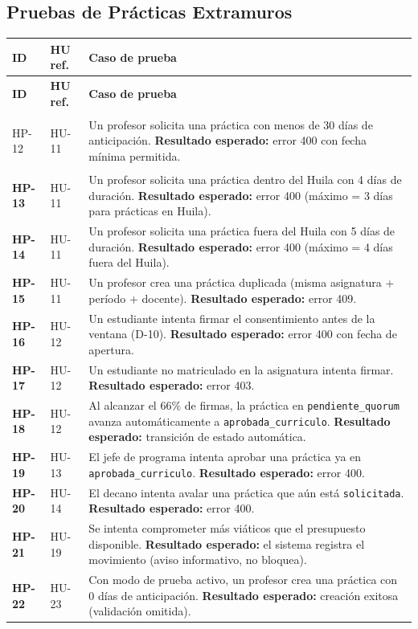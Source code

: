 \documentclass[12pt,a4paper]{article}
\begin{document}
\subsection{Pruebas de Prácticas Extramuros}

\begin{longtable}{>{\bfseries}p{1.2cm} p{2.5cm} p{9.5cm}}
  \toprule
  \textbf{ID} & \textbf{HU ref.} & \textbf{Caso de prueba} \\
  \midrule
  \endfirsthead
  \toprule \textbf{ID} & \textbf{HU ref.} & \textbf{Caso de prueba} \\ \midrule
  \endhead

  HP-12 & HU-11 & Un profesor solicita una práctica con menos de 30 días de anticipación. \textbf{Resultado esperado:} error 400 con fecha mínima permitida. \\[3pt]
  HP-13 & HU-11 & Un profesor solicita una práctica dentro del Huila con 4 días de duración. \textbf{Resultado esperado:} error 400 (máximo = 3 días para prácticas en Huila). \\[3pt]
  HP-14 & HU-11 & Un profesor solicita una práctica fuera del Huila con 5 días de duración. \textbf{Resultado esperado:} error 400 (máximo = 4 días fuera del Huila). \\[3pt]
  HP-15 & HU-11 & Un profesor crea una práctica duplicada (misma asignatura + período + docente). \textbf{Resultado esperado:} error 409. \\[3pt]
  HP-16 & HU-12 & Un estudiante intenta firmar el consentimiento antes de la ventana (D-10). \textbf{Resultado esperado:} error 400 con fecha de apertura. \\[3pt]
  HP-17 & HU-12 & Un estudiante no matriculado en la asignatura intenta firmar. \textbf{Resultado esperado:} error 403. \\[3pt]
  HP-18 & HU-12 & Al alcanzar el 66\% de firmas, la práctica en \texttt{pendiente\_quorum} avanza automáticamente a \texttt{aprobada\_curriculo}. \textbf{Resultado esperado:} transición de estado automática. \\[3pt]
  HP-19 & HU-13 & El jefe de programa intenta aprobar una práctica ya en \texttt{aprobada\_curriculo}. \textbf{Resultado esperado:} error 400. \\[3pt]
  HP-20 & HU-14 & El decano intenta avalar una práctica que aún está \texttt{solicitada}. \textbf{Resultado esperado:} error 400. \\[3pt]
  HP-21 & HU-19 & Se intenta comprometer más viáticos que el presupuesto disponible. \textbf{Resultado esperado:} el sistema registra el movimiento (aviso informativo, no bloquea). \\[3pt]
  HP-22 & HU-23 & Con modo de prueba activo, un profesor crea una práctica con 0 días de anticipación. \textbf{Resultado esperado:} creación exitosa (validación omitida). \\

  \bottomrule
\end{longtable}
\end{document}
